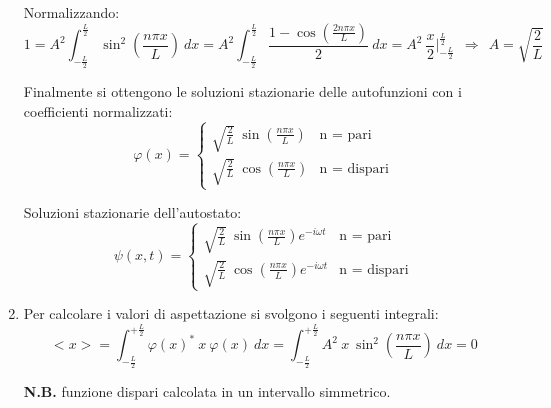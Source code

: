 \documentclass[12pt,twoside,a4]{article}
\begin{document}
\begin{solution}
\begin{enumerate}[label=(\textit{\roman*})]
Normalizzando: \begin{equation*}
 1 = A^2 \int_{-\frac{L}{2}}^{\frac{L}{2}} {\sin^2{\left( \frac{n \pi x}{L} \right)}} \ dx =  A^2 \int_{-\frac{L}{2}}^{\frac{L}{2}} { \frac{1- \cos{\left( \frac{ 2 n \pi x}{L} \right)}}{2}} \ dx = A^2 \ \frac{x}{2} \Big|_{-\frac{L}{2}}^{\frac{L}{2}} \ \  \Rightarrow \ \  A = \sqrt{\frac{2}{L}}  
\end{equation*}

Finalmente si ottengono le soluzioni stazionarie delle autofunzioni con i coefficienti normalizzati: \begin{equation*}
\varphi(x) = \begin{cases}
    \sqrt{\frac{2}{L}} \ \sin{\left(\frac{n \pi x }{L}\right)}  &  \text{n = pari} \\
    \sqrt{\frac{2}{L}} \ \cos{\left(\frac{n \pi x }{L}\right)}  &  \text{n = dispari}
\end{cases} 
\end{equation*}

Soluzioni stazionarie dell'autostato: \begin{equation*}
    \psi(x, t) = \begin{cases}
    \sqrt{\frac{2}{L}} \ \sin{\left(\frac{n \pi x }{L}\right)} e^{-i\omega t}  &  \text{n = pari} \\
    \sqrt{\frac{2}{L}} \ \cos{\left(\frac{n \pi x }{L}\right)} e^{-i\omega t}  &  \text{n = dispari}
\end{cases} 
\end{equation*}

\item  Per calcolare i valori di aspettazione si svolgono i seguenti integrali: \begin{equation*}
    < x >  = \int_{-\frac{L}{2}}^{+\frac{L}{2}} {\varphi(x)^\ast \ x \ \varphi(x)} \ dx = \int_{-\frac{L}{2}}^{+\frac{L}{2}} {A^2 \ x \ \sin^2{\left( \frac{n \pi x}{L}\right )} } \ dx = 0        
\end{equation*}

\textbf{N.B.} funzione dispari calcolata in un intervallo simmetrico.


\end{enumerate}
\end{solution}
\end{document}
